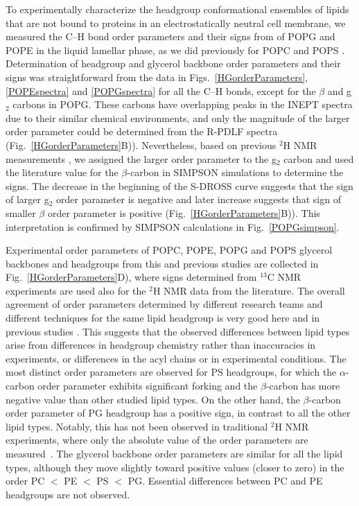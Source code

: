 \documentclass[aps,prl,superscriptaddress,twocolumn]{revtex4}
\begin{document}
To experimentally characterize the headgroup conformational ensembles of lipids
that are not bound to proteins in an electrostatically neutral cell membrane,
we measured the C--H bond order parameters and their signs from of POPG and POPE
in the liquid lamellar phase, as we did previously for POPC and POPS \cite{ferreira13,ferreira16,antila19}.
Determination of headgroup and glycerol backbone order parameters and their signs
was straightforward from the data in Figs.~\ref{HGorderParameters}, \ref{POPEspectra} and \ref{POPGspectra}
for all the C--H bonds, except for the $\beta$ and g$_2$ carbons in POPG.
These carbons have overlapping peaks in the INEPT spectra due to their similar chemical environments,
and only the magnitude of the larger order parameter could be determined from the R-PDLF spectra (Fig.~\ref{HGorderParameters}B)).
Nevertheless, based on previous $^2$H NMR measurements \cite{wohlgemuth80,gally81,borle85},
we assigned the larger order parameter to the g$_2$ carbon
and used the literature value for the $\beta$-carbon in SIMPSON simulations to determine the signs.
The decrease in the beginning of the S-DROSS curve suggests that the sign of larger g$_2$ order parameter
is negative and later increase suggests that sign of smaller $\beta$ order parameter is positive (Fig.~\ref{HGorderParameters}B)).
This interpretation is confirmed by SIMPSON calculations in Fig.~\ref{POPGsimpson}.




Experimental order parameters of POPC, POPE, POPG and POPS glycerol backbones and headgroups from this and previous studies are collected in Fig.~\ref{HGorderParameters}D), where signs determined from $^{13}$C NMR experiments are used also for the $^2$H NMR data from the literature. The overall agreement of order parameters determined by different research teams and different techniques for the same lipid headgroup is very good here and in previous studies \cite{botan15,ollila16,antila19}. This suggests that the observed differences between lipid types arise from differences in headgroup chemistry rather than inaccuracies in experiments, or differences in the acyl chains or in experimental conditions. The most distinct order parameters are observed for PS headgroups, for which the $\alpha$-carbon order parameter exhibits significant forking and the $\beta$-carbon has more negative value than other studied lipid types. On the other hand, the $\beta$-carbon order parameter of PG headgroup has a positive sign, in contrast to all the other lipid types. Notably, this has not been observed in traditional $^2$H NMR experiments, where only the absolute value of the order parameters are measured~\cite{wohlgemuth80,gally81,borle85}. The glycerol backbone order parameters are similar for all the lipid types, although they move slightly toward positive values (closer to zero) in the order PC $<$ PE $<$ PS $<$ PG. Essential differences between PC and PE headgroups are not observed.
\end{document}
